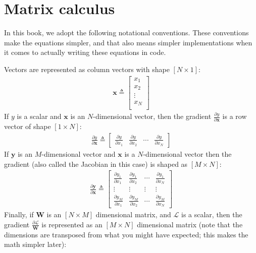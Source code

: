 

\appendix

\section{Matrix calculus}\label{appendix:matrix_calc:notational_conventions}
In this book, we adopt the following notational conventions. These conventions make the equations simpler, and that also means simpler implementations when it comes to actually writing these equations in code.

Vectors are represented as column vectors with shape $[N \times 1]$:
\begin{align}
    \mathbf{x} \triangleq 
    \begin{bmatrix}
    x_1  \\
    x_2  \\
    \vdots \\
    x_N \\
    \end{bmatrix}
\end{align}
If $y$ is a scalar and $\mathbf{x}$ is an $N$-dimensional vector, then the gradient $\frac{\partial y}{\partial \mathbf{x}}$ is a row vector of shape  $[1 \times N]$:
\begin{align}
    \frac{\partial y}{\partial \mathbf{x}} \triangleq  
\begin{bmatrix}
    \frac{\partial y}{\partial x_1} & \frac{\partial y}{\partial x_2} & \cdots & \frac{\partial y}{\partial x_N} \label{backprop:scalar_vector_deriv}
\end{bmatrix}
\end{align}
If $\mathbf{y}$ is an $M$-dimensional vector and $\mathbf{x}$ is a $N$-dimensional vector then the gradient (also called the Jacobian in this case) is shaped as $[M \times N]$:
\begin{align}
\frac{\partial \mathbf{y}}{\partial \mathbf{x}} \triangleq  
\begin{bmatrix}
    \frac{\partial y_1}{\partial x_1} & \frac{\partial y_1}{\partial x_2} & \cdots & \frac{\partial y_1}{\partial x_N} \\
    \vdots & \vdots & \vdots & \vdots \\
    \frac{\partial y_M}{\partial x_1} & \frac{\partial y_M}{\partial x_2} & \cdots & \frac{\partial y_M}{\partial x_N}
\end{bmatrix}
\end{align}
Finally, if $\mathbf{W}$ is an $[N \times M]$ dimensional matrix, and $\mathcal{L}$ is a scalar, then the gradient $\frac{\partial \mathcal{L}}{\mathbf{W}}$ is represented as an $[M \times N]$ dimensional matrix (note that the dimensions are transposed from what you might have expected; this makes the math simpler later):

